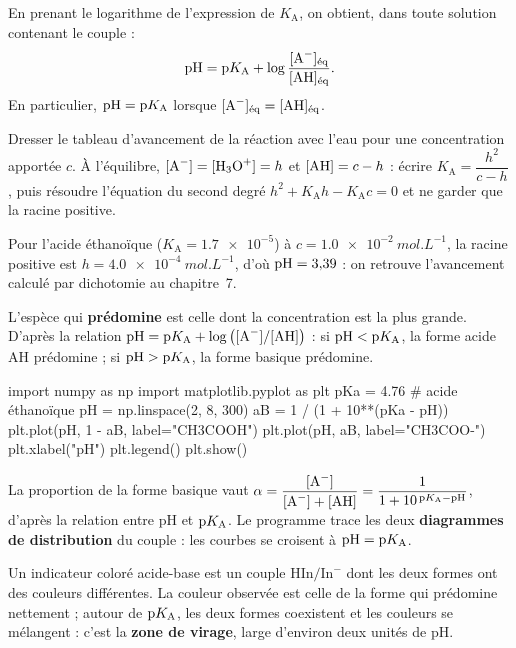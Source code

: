 \begin{propriete}
En prenant le logarithme de l'expression de $K_\mathrm{A}$, on obtient, dans toute solution contenant le couple :
\[\pH=\pKa+\log\frac{[\ce{A-}]_\text{éq}}{[\ce{AH}]_\text{éq}}.\]
En particulier, $\mathrm{pH}=\mathrm{p}K_{\mathrm{A}}$ lorsque $[\ce{A-}]_\text{éq}=[\ce{AH}]_\text{éq}$.
\end{propriete}
\begin{savoirfaire}
Dresser le tableau d'avancement de la réaction avec l'eau pour une concentration apportée $c$. À l'équilibre,
$[\ce{A-}]=[\ce{H3O+}]=h$ et $[\ce{AH}]=c-h$ : écrire $K_\mathrm{A}=\dfrac{h^2}{c-h}$, puis résoudre l'équation du second
degré $h^2+K_\mathrm{A}h-K_\mathrm{A}c=0$ et ne garder que la racine positive.
\end{savoirfaire}
\begin{exemple}
Pour l'acide éthanoïque ($K_\mathrm{A}=\num{1.7e-5}$) à $c=\qty{1,0e-2}{mol.L^{-1}}$, la racine positive est
$h=\qty{4,0e-4}{mol.L^{-1}}$, d'où $\mathrm{pH}=3{,}39$ : on retrouve l'avancement calculé par dichotomie au chapitre~7.
\end{exemple}
\begin{propriete}
L'espèce qui \textbf{prédomine} est celle dont la concentration est la plus grande. D'après la relation
$\pH=\pKa+\log\left([\ce{A-}]/[\ce{AH}]\right)$ : si $\mathrm{pH}<\mathrm{p}K_{\mathrm{A}}$, la forme acide AH prédomine ; si $\mathrm{pH}>\mathrm{p}K_{\mathrm{A}}$, la forme
basique  prédomine.
\end{propriete}
\begin{codecote}[0.58]
\begin{pythoncol}
import numpy as np
import matplotlib.pyplot as plt
pKa = 4.76     # acide éthanoïque
pH = np.linspace(2, 8, 300)
aB = 1 / (1 + 10**(pKa - pH))
plt.plot(pH, 1 - aB, label="CH3COOH")
plt.plot(pH, aB, label="CH3COO-")
plt.xlabel("pH")
plt.legend()
plt.show()
\end{pythoncol}
\cote
\fontsize{9.5}{12.5}\selectfont
{}\par\smallskip
La proportion de la forme basique vaut
$\alpha=\dfrac{[\ce{A-}]}{[\ce{A-}]+[\ce{AH}]}=\dfrac{1}{1+10^{\,\pKa-\pH}}$, d'après la relation entre pH et $\mathrm{p}K_{\mathrm{A}}$.
Le programme trace les deux \textbf{diagrammes de distribution} du couple : les courbes se croisent à $\mathrm{pH}=\mathrm{p}K_{\mathrm{A}}$.
\end{codecote}
\begin{propriete}
Un indicateur coloré acide-base est un couple $\mathrm{HIn}/\mathrm{In}^-$ dont les deux formes ont des couleurs
différentes. La couleur observée est celle de la forme qui prédomine nettement ; autour de $\mathrm{p}K_{\mathrm{A}}$, les deux formes
coexistent et les couleurs se mélangent : c'est la \textbf{zone de virage}, large d'environ deux unités de pH.
\end{propriete}
